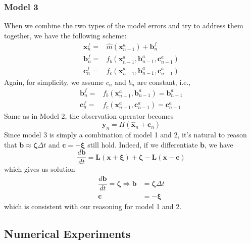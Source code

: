 \documentclass[twocolumn]{article}
\begin{document}
\subsubsection{Model 3} \label{model3}
When we combine the two types of the model errors and try to address them together, we have the following scheme:
\begin{align}
\pmb{x}_{n}^{f}=&\hat{m}(\pmb{x}_{n-1}^{a})+\pmb{b}_{n}^{f}\\
\pmb{b}_{n}^{f}=&f_{b}(\pmb{x}_{n-1}^{a},\pmb{b}_{n-1}^{a},\pmb{c}_{n-1}^{a})\\
\pmb{c}_{n}^{f}=&f_{c}(\pmb{x}_{n-1}^{a},\pmb{b}_{n-1}^{a},\pmb{c}_{n-1}^{a})
\end{align}
Again, for simplicity, we assume $c_n$ and $b_n$ are constant, i.e.,
\begin{align}
\pmb{b}_{n}^{f}=&f_{b}(\pmb{x}_{n-1}^{a},\pmb{b}_{n-1}^{a})=\pmb{b}_{n-1}^{a}\\
\pmb{c}_{n}^{f}=&f_{c}(\pmb{x}_{n-1}^{a},\pmb{c}_{n-1}^{a})=\pmb{c}_{n-1}^{a}
\end{align}
Same as in Model 2, the observation operator becomes
\begin{equation}
\pmb{y}_n=H(\hat{\pmb{x}}_n+\pmb{c}_n)
\end{equation}
Since model 3 is simply a combination of model 1 and 2, it's natural to reason that $\pmb{b}\approx\pmb{\zeta}\Delta t$ and $\pmb{c}=-\pmb{\xi}$ still hold. Indeed, if we differentiate $\pmb{b}$, we have
\begin{equation}
\dfrac{d\pmb{b}}{dt}=\pmb{L}(\pmb{x}+\pmb{\xi})+\pmb{\zeta}-\pmb{L}(\pmb{x}-\pmb{c})
\end{equation}
which gives us solution
\begin{align}
\dfrac{d\pmb{b}}{dt}=\pmb{\zeta}\Rightarrow\pmb{b}&=\pmb{\zeta}\Delta t\\
\pmb{c}&=-\pmb{\xi}
\end{align}
which is consistent with our reasoning for model 1 and 2.
\subsection{Numerical Experiments}
\end{document}
